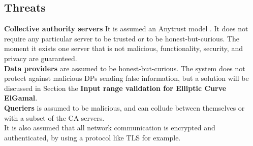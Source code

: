 \documentclass{article}
\begin{document}
\subsection{Threats}
\textbf{Collective authority servers} It is assumed an Anytrust model \cite{anytrust}. It does not require any particular server to be trusted or to be honest-but-curious. The moment it exists one server that is not malicious, functionality, security, and privacy are guaranteed.\\
\textbf{Data providers} are assumed to be honest-but-curious. The system does not protect against malicious DPs sending false information, but a solution will be discussed  in Section the \textbf{Input range validation for Elliptic Curve ElGamal}.\\
\textbf{Queriers} is assumed to be malicious, and can collude between themselves or with a subset of the CA servers.\\
It is also assumed that all network communication is encrypted and authenticated, by using a protocol like TLS for example.
\end{document}
